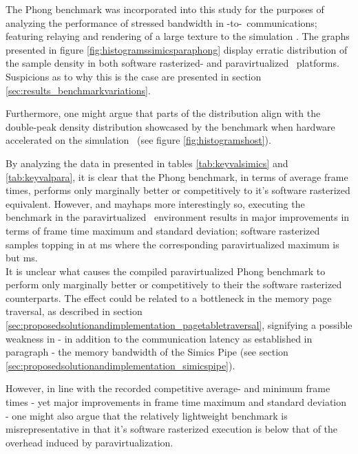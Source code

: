 \noindent
The Phong benchmark was incorporated into this study for the purposes of analyzing the performance of stressed bandwidth in \dvttermtarget -to-\dvttermhost\ communications; featuring relaying and rendering of a large texture to the simulation \dvttermhost .
The graphs presented in figure \ref{fig:histogramssimicsparaphong} display erratic distribution of the sample density in both software rasterized- and paravirtualized \dvttermsimics\ platforms.
Suspicions as to why this is the case are presented in section \ref{sec:results_benchmarkvariations}.

Furthermore, one might argue that parts of the distribution align with the double-peak density distribution showcased by the benchmark when hardware accelerated on the simulation \dvttermhost\ (see figure \ref{fig:histogramshost}).


By analyzing the data in presented in tables \ref{tab:keyvalsimics} and \ref{tab:keyvalpara}, it is clear that the Phong benchmark, in terms of average frame times, performs only marginally better or competitively to it's software rasterized equivalent.
However, and mayhaps more interestingly so, executing the benchmark in the paravirtualized \dvttermsimics\ environment results in major improvements in terms of frame time maximum and standard deviation; software rasterized samples topping in at  ms where the corresponding paravirtualized maximum is but  ms.\\

\noindent
It is unclear what causes the compiled paravirtualized Phong benchmark to perform only marginally better or competitively to their the software rasterized counterparts.
The effect could be related to a bottleneck in the memory page traversal, as described in section \ref{sec:proposedsolutionandimplementation_pagetabletraversal}, signifying a possible weakness in - in addition to the communication latency as established in paragraph  - the memory bandwidth of the Simics Pipe (see section \ref{sec:proposedsolutionandimplementation_simicspipe}).

However, in line with the recorded competitive average- and minimum frame times - yet major improvements in frame time maximum and standard deviation - one might also argue that the relatively lightweight benchmark is misrepresentative in that it's software rasterized execution is below that of the overhead induced by paravirtualization.

